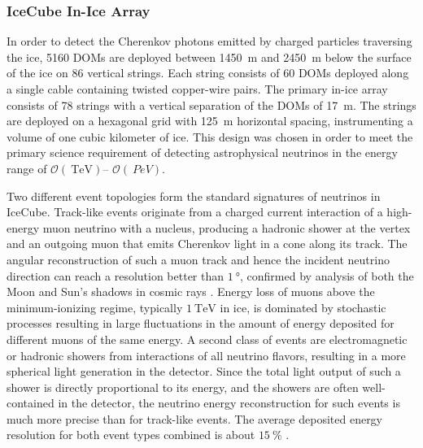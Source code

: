 \subsubsection{IceCube In-Ice Array}

In order to detect the Cherenkov photons emitted by charged particles
traversing the ice, \num{5160} DOMs are deployed between \SI{1450}{\meter}
and \SI{2450} {\meter} below the surface of the ice on \num{86} vertical
strings. Each string consists of \num{60} DOMs deployed along a
single cable containing twisted copper-wire pairs. The 
primary in-ice array consists of \num{78} strings with a vertical
separation of the DOMs of \SI{17}{\meter}.  The strings are
deployed on a hexagonal grid with \SI{125}{\meter} horizontal spacing,
instrumenting a volume of one cubic kilometer of ice.  This design was chosen in
order to meet the primary science requirement of detecting astrophysical
neutrinos in the energy range of $\mathcal{O}(\SI{}{\tera\electronvolt})$--
$\mathcal{O}(\SI{}{PeV})$.  %

Two different event topologies form the standard signatures of neutrinos in
IceCube.  Track-like events originate from a charged current interaction of
a high-energy muon neutrino with a nucleus, producing a hadronic shower at
the vertex and an outgoing muon that emits Cherenkov light in a cone along its
track.  The angular reconstruction of such a muon track and hence the
incident neutrino direction can reach a resolution better than
$\SI{1}{\degree}$, confirmed by analysis of both the Moon and Sun's shadows
in cosmic rays \cite{IC3:moon,IC3:sun}. Energy loss of muons above the
minimum-ionizing regime, typically $\SI{1}{\tera\electronvolt}$ in ice, is
dominated by stochastic 
processes resulting in large fluctuations in the amount of energy deposited
for different muons of the same energy.  A second class of events are
electromagnetic or hadronic showers from interactions of all neutrino
flavors, resulting in a more spherical light generation in the detector.
Since the total light output of such a shower is directly proportional to its energy, and
the showers are often well-contained in the detector, the neutrino energy
reconstruction for such events is much more precise than for track-like
events. The average deposited energy resolution for both event types
combined is about $\SI{15}{\%}$ \cite{IC3:ereco}. 

